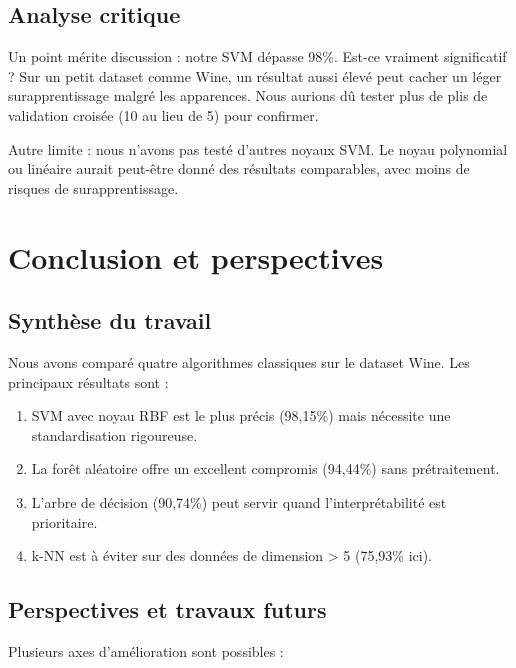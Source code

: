 \documentclass[conference]{IEEEtran}
\begin{document}
\subsection{Analyse critique}

Un point mérite discussion : notre SVM dépasse 98\%. Est-ce vraiment significatif ? Sur un petit dataset comme Wine, un résultat aussi élevé peut cacher un léger surapprentissage malgré les apparences. Nous aurions dû tester plus de plis de validation croisée (10 au lieu de 5) pour confirmer.

Autre limite : nous n'avons pas testé d'autres noyaux SVM. Le noyau polynomial ou linéaire aurait peut-être donné des résultats comparables, avec moins de risques de surapprentissage.


\section{Conclusion et perspectives}

\subsection{Synthèse du travail}

Nous avons comparé quatre algorithmes classiques sur le dataset Wine. Les principaux résultats sont :

\begin{enumerate}
    \item SVM avec noyau RBF est le plus précis (98,15\%) mais nécessite une standardisation rigoureuse.
    \item La forêt aléatoire offre un excellent compromis (94,44\%) sans prétraitement.
    \item L'arbre de décision (90,74\%) peut servir quand l'interprétabilité est prioritaire.
    \item k-NN est à éviter sur des données de dimension > 5 (75,93\% ici).
\end{enumerate}

\subsection{Perspectives et travaux futurs}

Plusieurs axes d'amélioration sont possibles :
\end{document}
